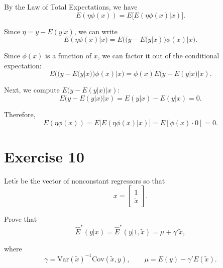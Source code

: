 \documentclass[12pt, letterpaper, onecolumn]{exam}
\begin{document}
\begin{solution}
    By the Law of Total Expectations, we have
    \[
        E(\eta \phi(x))=E\big[E(\eta \phi(x)|x)\big].
    \]

    Since $\eta=y-E(y|x)$, we can write
    \[
        E(\eta \phi(x)|x)=E\big((y-E(y|x))\phi(x)|x\big).
    \]

    Since $\phi(x)$ is a function of $x$, we can factor it out of the
    conditional expectation:
    \[
        E\big((y-E(y|x))\phi(x)|x\big)=\phi(x)E(y-E(y|x)|x).
    \]

    Next, we compute $E(y-E(y|x)|x)$:
    \[
        E(y-E(y|x)|x)=E(y|x)-E(y|x)=0.
    \]

    Therefore,
    \[
        E(\eta \phi(x))=E\big[E(\eta \phi(x)|x)\big]=E[\phi(x)\cdot 0]=0.
    \]
\end{solution}

\section*{Exercise 10}
Let$\tilde{x}$ be the vector of nonconstant regressors so that
\[
    x=
    \begin{bmatrix}
        1 \\
        \tilde{x}
    \end{bmatrix}.
\]

Prove that
\[
    \hat{E}^{*}(y|x)=\hat{E}^{*}(y|1,\tilde{x})=\mu+\gamma'\tilde{x}, \tag{2.9.7}
\]

where
\[
    \gamma=\mathrm{Var}(\tilde{x})^{-1}\mathrm{Cov}(\tilde{x},y), \qquad \mu=
    E(y)-\gamma' E(\tilde{x}).
\]
\end{document}
